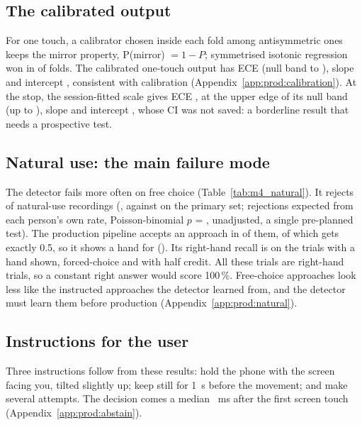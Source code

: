 \subsection{The calibrated output}\label{sec:production:calibration}
For one touch, a calibrator chosen inside each fold among antisymmetric ones keeps the mirror property, P(mirror)
$= 1 - P$; symmetrised isotonic regression won in  of 
folds. The calibrated one-touch output has ECE  (null band  to
), slope  and intercept ,
consistent with calibration (Appendix~\ref{app:prod:calibration}). At the stop, the session-fitted scale gives ECE
, at the upper edge of its null band (up to
), slope  and intercept
, whose CI was not saved: a borderline result that needs a prospective test.

\subsection{Natural use: the main failure mode}\label{sec:production:natural}
The detector fails more often on free choice (Table~\ref{tab:m4_natural}). It rejects  of
 natural-use recordings (, against  on the primary
set;  rejections expected from each person's own rate, Poisson-binomial
$p$ = , unadjusted, a single pre-planned test). The production pipeline accepts an approach in
 of them,  of which gets exactly 0.5, so it shows a hand for
 (). Its right-hand recall is
 on the trials with a hand shown,  forced-choice and
 with half credit. All
these trials are right-hand trials, so a constant right answer would score 100\,\%. Free-choice approaches look
less like the instructed approaches the detector learned from, and the detector must learn them before production
(Appendix~\ref{app:prod:natural}).


\subsection{Instructions for the user}\label{sec:production:instructions}
Three instructions follow from these results: hold the phone with the screen facing you, tilted slightly up; keep
still for 1~s before the movement; and make several attempts. The decision comes a median ~ms
after the first screen touch (Appendix~\ref{app:prod:abstain}).

